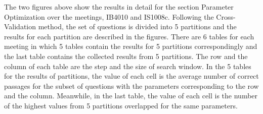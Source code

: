 The two figures above show the results in detail for the section Parameter Optimization over the meetings, IB4010 and IS1008c. Following the Cross-Validation method, the set of questions is divided into 5 partitions and the results for each partition are described in the figures. There are 6 tables for each meeting in which 5 tables contain the results for 5 partitions correspondingly and the last table contains the collected results from 5 partitions. The row and the column of each table are the step and the size of search window. In the 5 tables for the results of partitions, the value of each cell is the average number of correct passages for the subset of questions with the parameters corresponding to the row and the column. Meanwhile, in the last table, the value of each cell is the number of the highest values from 5 partitions overlapped for the same parameters.


%
%
%
%
%


